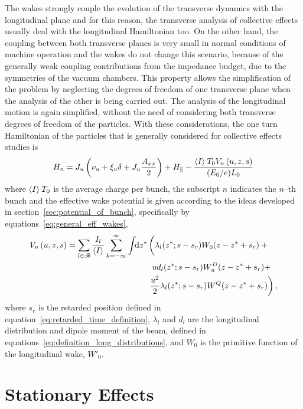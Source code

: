     The wakes strongly couple the evolution of the transverse dynamics with the longitudinal plane and for this reason, the transverse analysis of collective effects usually deal with the longitudinal Hamiltonian too. On the other hand, the coupling between both transverse planes is very small in normal conditions of machine operation and the wakes do not change this scenario, because of the generally weak coupling contributions from the impedance budget, due to the symmetries of the vacuum chambers. This property allows the simplification of the problem by neglecting the degrees of freedom of one transverse plane when the analysis of the other is being carried out. The analysis of the longitudinal motion is again simplified, without the need of considering both transverse degrees of freedom of the particles. With these considerations, the one turn Hamiltonian of the particles that is generally considered for collective effects studies is
    \begin{align}\label{eq:current_depend_hamiltonian}
        H_n = J_u\left(\nu_u + \xi_u\delta + J_u\frac{A_{xx}}{2}\right) +
                H_{\parallel} - \frac{\left\langle I \right\rangle_{{}}T_0V_n\left(u, z, s\right)}{(E_0/e)L_0}
    \end{align}
    where $\left\langle I \right\rangle_{{}}T_0$ is the average charge per bunch, the subscript $n$ indicates the $n$--th bunch and the effective wake potential is given according to the ideas developed in section~\ref{sec:potential_of_bunch}, specifically by equations~\eqref{eq:general_eff_wakes},
    \begin{align}\label{eq:generalwake}
        V_n\fof{u, z, s} =\nonumber \sum_{l\in\mathscr{B}}\frac{I_l}{\average{I}}\sum_{k=-\infty}^\infty\udefint{z^*}{
        &\left(\lambda_l(z^*; s - s_r) W_0(z-z^* + s_r) + \vphantom{\frac{u^2}{2}}\right.\\\nonumber
        &\hphantom{u}ud_l(z^*; s -s_r) W^D_u(z-z^* + s_r) +\\
        &\left. \frac{u^2}{2}\lambda_l(z^*; s - s_r) W^Q(z-z^* + s_r)\right)},
    \end{align}
    where $s_r$ is the retarded position defined in equation~\eqref{eq:retarded_time_definition}, $\lambda_l$ and $d_l$ are the longitudinal distribution and dipole moment of the beam, defined in equations~\eqref{eq:definition_long_distributions}, and $W_0$ is the primitive function of the longitudinal wake, $W'_0$.

\section{Stationary Effects}

